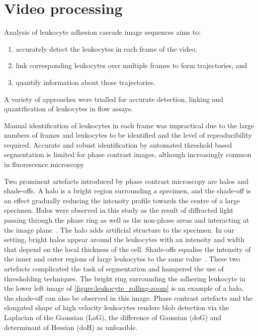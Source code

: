 \section{Video processing}
\label{leukocytes:processing}
Analysis of leukocyte adhesion cascade image sequences aims to:
\begin{enumerate}
\item accurately detect the leukocytes in each frame of the video, 
\item link corresponding leukocytes over multiple frames to form trajectories, and 
\item quantify information about those trajectories.
\end{enumerate}
A variety of approaches were trialled for accurate detection, linking and quantification of leukocytes in flow assays.

Manual identification of leukocytes in each frame was impractical due to the large numbers of frames and leukocytes to be identified and the level of reproducibility required. Accurate and robust identification by automated threshold based segmentation is limited for phase contrast images, although increasingly common in fluorescence microscopy~\cite{Hand2009}

Two prominent artefacts introduced by phase contrast microscopy are halos and shade-offs. A halo is a bright region surrounding a specimen, and the shade-off is an effect gradually reducing the intensity profile towards the centre of a large specimen. Halos were observed in this study as the result of diffracted light passing through the phase ring as well as the non-phase areas and interacting at the image plane~\cite{Yin2012}. The halo adds artificial structure to the specimen. In our setting, bright halos appear around the leukocytes with an intensity and width that depend on the local thickness of the cell. Shade-offs equalise the intensity of the inner and outer regions of large leukocytes to the same value~\cite{Otaki2000}. These two artefacts complicated the task of segmentation and hampered the use of thresholding techniques. The bright ring surrounding the adhering leukocyte in the lower left image of \autoref{figure:leukocyte_rolling-zoom} is an example of a halo, the shade-off can also be observed in this image. Phase contrast artefacts and the elongated shape of high velocity leukocytes renders blob detection via the Laplacian of the Gaussian (LoG), the difference of Gaussian (doG) and determinant of Hessian (doH) as unfeasible.

